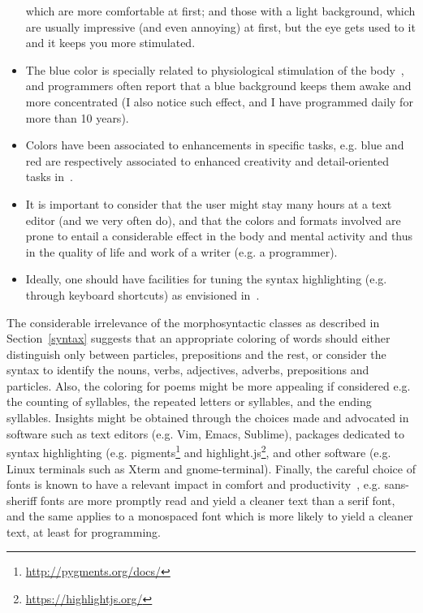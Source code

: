 \begin{itemize}
  which are more comfortable at first; and those with a light background,
  which are usually impressive (and even annoying) at first,
  but the eye gets used to it and it keeps you more stimulated.
\item The blue color is specially related to physiological
  stimulation of the body~\cite{blue,blue2},
    and programmers often report that a blue background keeps them
    awake and more concentrated (I also notice such effect,
    and I have programmed daily for more than 10 years).
  \item Colors have been associated to enhancements in specific tasks,
    e.g. blue and red are respectively associated to enhanced
    creativity and detail-oriented tasks in~\cite{blue}.
  \item It is important to consider that the user might 
    stay many hours
  at a text editor (and we very often do),
    and that the colors and formats involved are
  prone to entail a considerable effect in the body and mental
    activity and thus in the quality of life and work of a writer
    (e.g. a programmer).
  \item Ideally, one should have facilities for tuning 
    the syntax highlighting (e.g. through keyboard shortcuts)
  as envisioned in~\cite{vim}.
\end{itemize}

The considerable irrelevance of the morphosyntactic classes as
described in Section~\ref{syntax} suggests that an appropriate coloring
of words should
either distinguish only between particles, prepositions and the rest,
or consider the syntax to identify the nouns, verbs, adjectives, adverbs,
prepositions and particles.
Also, the coloring for poems might be more appealing if considered
e.g. the counting of syllables, the repeated letters or syllables,
and the ending syllables.
Insights might be obtained through the
choices made and advocated in software such as text editors
(e.g. Vim, Emacs, Sublime),
packages dedicated to syntax highlighting (e.g.
pigments\footnote{\url{http://pygments.org/docs/}} and 
highlight.js\footnote{\url{https://highlightjs.org/}},
and
other software (e.g. Linux terminals such as Xterm and gnome-terminal).
Finally, the careful choice of fonts is known to have
a relevant impact in comfort and productivity~\cite{fonts},
e.g. sans-sheriff fonts are more promptly read and yield a cleaner
text than a serif font, and the same applies to a monospaced font
which is more likely to yield a cleaner text, at least for programming.

